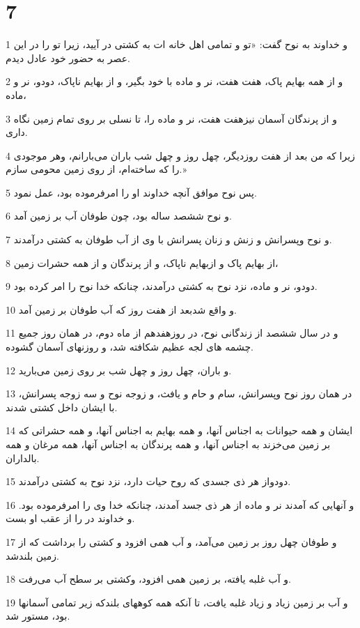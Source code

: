 \chapter{7}

\par 1 و خداوند به نوح گفت: «تو و تمامی اهل خانه ات به کشتی در آیید، زیرا تو را در این عصر به حضور خود عادل دیدم.
\par 2 و از همه بهایم پاک، هفت هفت، نر و ماده با خود بگیر، و از بهایم ناپاک، دودو، نر و ماده،
\par 3 و از پرندگان آسمان نیزهفت هفت، نر و ماده را، تا نسلی بر روی تمام زمین نگاه داری.
\par 4 زیرا که من بعد از هفت روزدیگر، چهل روز و چهل شب باران می‌بارانم، وهر موجودی را که ساخته‌ام، از روی زمین محومی سازم.»
\par 5 پس نوح موافق آنچه خداوند او را امرفرموده بود، عمل نمود.
\par 6 و نوح ششصد ساله بود، چون طوفان آب بر زمین آمد.
\par 7 و نوح وپسرانش و زنش و زنان پسرانش با وی از آب طوفان به کشتی در‌آمدند.
\par 8 از بهایم پاک و ازبهایم ناپاک، و از پرندگان و از همه حشرات زمین،
\par 9 دودو، نر و ماده، نزد نوح به کشتی در‌آمدند، چنانکه خدا نوح را امر کرده بود.
\par 10 و واقع شدبعد از هفت روز که آب طوفان بر زمین آمد.
\par 11 و در سال ششصد از زندگانی نوح، در روزهفدهم از ماه دوم، در همان روز جمیع چشمه های لجه عظیم شکافته شد، و روزنهای آسمان گشوده.
\par 12 و باران، چهل روز و چهل شب بر روی زمین می‌بارید.
\par 13 در همان روز نوح وپسرانش، سام و حام و یافث، و زوجه نوح و سه زوجه پسرانش، با ایشان داخل کشتی شدند.
\par 14 ایشان و همه حیوانات به اجناس آنها، و همه بهایم به اجناس آنها، و همه حشراتی که بر زمین می‌خزند به اجناس آنها، و همه پرندگان به اجناس آنها، همه مرغان و همه بالداران.
\par 15 دودواز هر ذی جسدی که روح حیات دارد، نزد نوح به کشتی در‌آمدند.
\par 16 و آنهایی که آمدند نر و ماده از هر ذی جسد آمدند، چنانکه خدا وی را امرفرموده بود. و خداوند در را از عقب او بست.
\par 17 و طوفان چهل روز بر زمین می‌آمد، و آب همی افزود و کشتی را برداشت که از زمین بلندشد.
\par 18 و آب غلبه یافته، بر زمین همی افزود، وکشتی بر سطح آب می‌رفت.
\par 19 و آب بر زمین زیاد و زیاد غلبه یافت، تا آنکه همه کوههای بلندکه زیر تمامی آسمانها بود، مستور شد.

